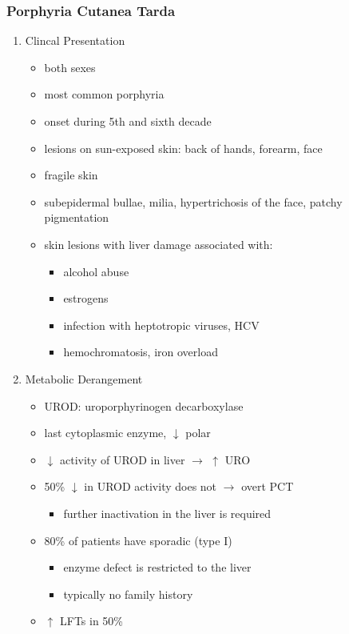 \documentclass{scrartcl}
\begin{document}
\subsubsection{Porphyria Cutanea Tarda}
\label{sec:org1d2678c}
\begin{enumerate}
\item Clincal Presentation
\label{sec:orgda18086}
\begin{itemize}
\item both sexes
\item most common porphyria
\item onset during 5th and sixth decade
\item lesions on sun-exposed skin: back of hands, forearm, face
\item fragile skin
\item subepidermal bullae, milia, hypertrichosis of the face, patchy pigmentation
\item skin lesions with liver damage associated with:
\begin{itemize}
\item alcohol abuse
\item estrogens
\item infection with heptotropic viruses, HCV
\item hemochromatosis, iron overload
\end{itemize}
\end{itemize}
\item Metabolic Derangement
\label{sec:org4baef47}
\begin{itemize}
\item UROD: uroporphyrinogen decarboxylase
\item last cytoplasmic enzyme, \(\downarrow\) polar
\item \(\downarrow\) activity of UROD in liver \(\to\) \(\uparrow\) URO
\item 50\% \(\downarrow\) in UROD activity does not \(\to\) overt PCT
\begin{itemize}
\item further inactivation in the liver is required
\end{itemize}
\item 80\% of patients have sporadic (type I)
\begin{itemize}
\item enzyme defect is restricted to the liver
\item typically no family history
\end{itemize}
\item \(\uparrow\) LFTs in 50\%

\end{itemize}
\end{enumerate}
\end{document}
